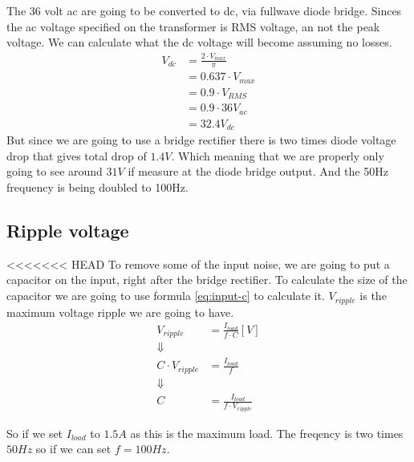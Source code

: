The 36 volt ac are going to be converted to dc, via fullwave diode bridge. Sinces the ac voltage specified on the transformer is RMS voltage, an not the peak voltage. We can calculate what the dc voltage will become assuming no losses.
\begin{align} \label{eq:calc_vdc}
V_{ dc } &= \frac{ 2 \cdot V_{ max } }{ \pi } \\
         &= 0.637 \cdot V_{ max } \\
         &= 0.9 \cdot V_{ RMS } \\
         &= 0.9 \cdot 36 V_{ac} \nonumber \\
         &= 32.4 V_{ dc } \nonumber
\end{align}
But since we are going to use a bridge rectifier there is two times diode voltage drop that gives total drop of \(1.4V\). Which meaning that we are properly only going to see around \( 31V \) if measure at the diode bridge output. And the 50Hz frequency is being doubled to 100Hz.

\subsection{Ripple voltage}
<<<<<<< HEAD
To remove some of the input noise, we are going to put a capacitor on the input, right after the bridge rectifier. To calculate the size of the capacitor we are going to use formula \ref{eq:input-c} to calculate it. $V_{ ripple }$ is the maximum voltage ripple we are going to have.
\begin{align}\label{eq:calc_vripple}
V_{ ripple } &= \frac{ I_{ load } }{ f \cdot C } [V] \\ 
\Downarrow \nonumber \\
C \cdot V_{ ripple } &= \frac{ I_{ load } }{ f } \nonumber \\
\Downarrow \nonumber \\
C &= \frac{ I_{ load } }{ f \cdot V_{ ripple } }\label{eq:input-c}
\end{align}

So if we set $I_{ load }$ to $1.5A$ as this is the maximum load. The freqency is two times $50Hz$ so if we can set $f=100Hz$.

